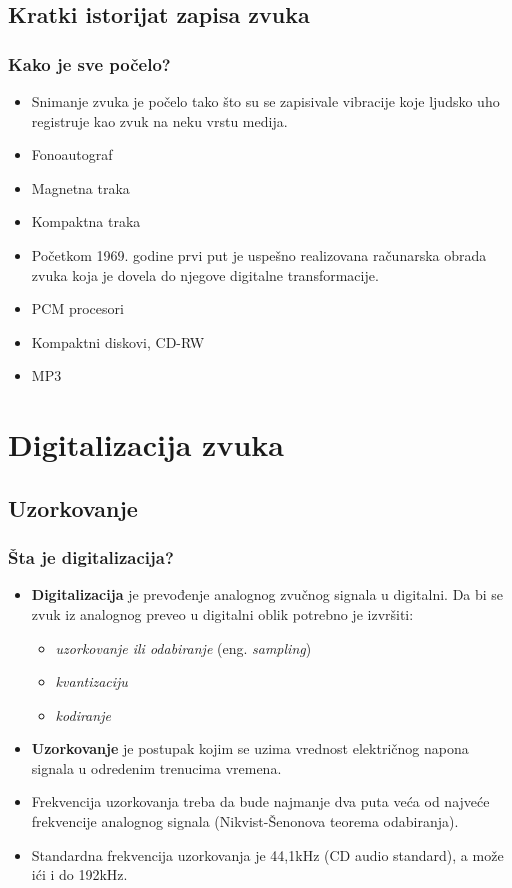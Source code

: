 \documentclass{beamer}
\begin{document}
\subsection{Kratki istorijat zapisa zvuka}
\begin{frame}[fragile]\frametitle{Kako je sve počelo?}
	\begin{itemize}	
		\item Snimanje zvuka je počelo tako što su se zapisivale vibracije koje ljudsko uho registruje kao zvuk na neku vrstu medija.
		\item Fonoautograf
		\item Magnetna traka
        \item Kompaktna traka
		\item Početkom 1969. godine prvi put je uspešno realizovana računarska obrada zvuka koja je dovela do njegove digitalne transformacije.
		\item PCM procesori
		\item Kompaktni diskovi, CD-RW
		\item MP3
	\end{itemize}
\end{frame}

\section{Digitalizacija zvuka}
\subsection{Uzorkovanje}
\begin{frame}[fragile]\frametitle{Šta je digitalizacija?}
\begin{itemize}
	\item \textbf{Digitalizacija} je prevođenje analognog zvučnog signala u digitalni. Da bi se zvuk iz analognog preveo u digitalni oblik potrebno je izvršiti:
    \begin{itemize}			
		\item \textit{uzorkovanje ili odabiranje} (eng. \textit{sampling})
		\item \textit{kvantizaciju}
        \item \textit{kodiranje}
    \end{itemize}
	\item \textbf{Uzorkovanje} je postupak kojim se uzima vrednost električnog napona signala u odredenim trenucima vremena.
	\item Frekvencija uzorkovanja treba da bude najmanje dva puta veća od najveće frekvencije analognog signala (Nikvist-Šenonova teorema odabiranja).
	\item Standardna frekvencija uzorkovanja je 44,1kHz (CD audio standard), a može ići i do 192kHz. 
\end{itemize}

\end{frame}
\end{document}
